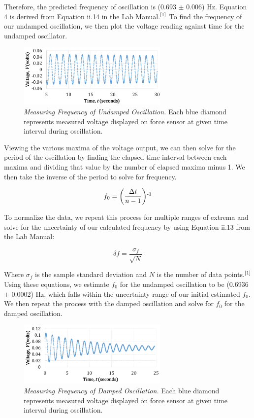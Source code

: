 \documentclass[twoside,twocolumn]{article}
\begin{document}
\noindent Therefore, the predicted frequency of oscillation is (0.693 $\pm$ 0.006) Hz. Equation 4 is derived from Equation ii.14 in the Lab Manual.$\textsuperscript{[1]}$ To find the frequency of our undamped oscillation, we then plot the voltage reading against time for the undamped oscillator.

\begin{figure}[!htbp]
    \centering
    \includegraphics[width=2.9in]{UndampedOsc.png}
    \caption{\textit{Measuring Frequency of Undamped Oscillation.} Each blue diamond represents measured voltage displayed on force sensor at given time interval during oscillation.}
\end{figure}

\noindent Viewing the various maxima of the voltage output, we can then solve for the period of the oscillation by finding the elapsed time interval between each maxima and dividing that value by the number of elapsed maxima minus 1. We then take the inverse of the period to solve for frequency.

\footnotesize
\begin{equation}
f_0 = \bigg (\frac{\Delta t}{n-1} \bigg )\textsuperscript{-1}
\end{equation}
\normalsize

\noindent To normalize the data, we repeat this process for multiple ranges of extrema and solve for the uncertainty of our calculated frequency by using Equation ii.13 from the Lab Manual:

\footnotesize
\begin{equation}
\delta f = \frac{\sigma_f}{\sqrt{N}}
\end{equation}
\normalsize

\noindent Where $\sigma_f$ is the sample standard deviation and $N$ is the number of data points.$\textsuperscript{[1]}$ Using these equations, we estimate $f_0$ for the undamped oscillation to be (0.6936 $\pm$ 0.0002) Hz, which falls within the uncertainty range of our initial estimated $f_0$. We then repeat the process with the damped oscillation and solve for $f_0$ for the damped oscillation.

\begin{figure}[!htbp]
    \centering
    \includegraphics[width=2.9in]{DampedOsc.png}
    \caption{\textit{Measuring Frequency of Damped Oscillation.} Each blue diamond represents measured voltage displayed on force sensor at given time interval during oscillation.}
\end{figure}
\end{document}
